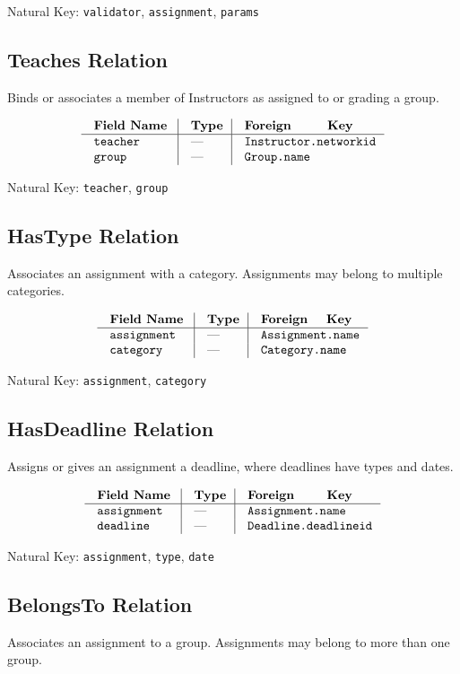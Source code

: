 {\noindent
Natural Key: {\tt validator}, {\tt assignment}, {\tt params}\par}

\subsection{Teaches Relation}
Binds or associates a member of Instructors as assigned to or grading a group.

$$\vbox{
  \offinterlineskip
  \halign{
    \strut \quad {\tt #}  & \vrule\quad #  & \vrule\quad # \cr
    {\bf Field Name}  & {\bf Type}  & {\bf Foreign Key}\cr
    \noalign{\hrule}    
    teacher  & ---  & {\tt Instructor.networkid} \cr
    group  & ---  & {\tt Group.name} \cr
  }
}$$

{\noindent
Natural Key: {\tt teacher}, {\tt group}\par}

\subsection{HasType Relation}
Associates an assignment with a category. 
Assignments may belong to multiple categories.

$$\vbox{
  \offinterlineskip
  \halign{
    \strut \quad {\tt #}  & \vrule\quad #  & \vrule\quad # \cr
    {\bf Field Name}  & {\bf Type}  & {\bf Foreign Key}\cr
    \noalign{\hrule}    
    assignment  & ---  & {\tt Assignment.name} \cr
    category  & ---  & {\tt Category.name} \cr
  }
}$$

{\noindent
Natural Key: {\tt assignment}, {\tt category}\par}

\subsection{HasDeadline Relation}
Assigns or gives an assignment a deadline,
where deadlines have types and dates.

$$\vbox{
  \offinterlineskip
  \halign{
    \strut \quad {\tt #}  & \vrule\quad #  & \vrule\quad # \cr
    {\bf Field Name}  & {\bf Type}  & {\bf Foreign Key}\cr
    \noalign{\hrule}    
    assignment  & ---  & {\tt Assignment.name} \cr
    deadline & --- & {\tt Deadline.deadlineid} \cr
  }
}$$

{\noindent
Natural Key: {\tt assignment}, {\tt type}, {\tt date}\par}

\subsection{BelongsTo Relation}
Associates an assignment to a group.
Assignments may belong to more than one group.

